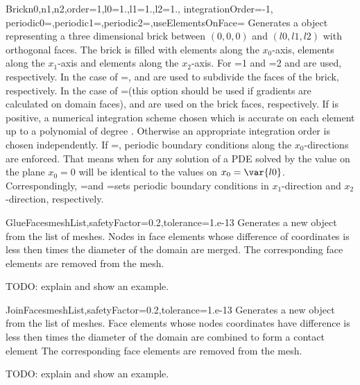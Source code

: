 \begin{funcdesc}{Brick}{n0,n1,n2,order=1,l0=1.,l1=1.,l2=1., integrationOrder=-1, \\
  periodic0=\False,periodic1=\False,periodic2=\False,useElementsOnFace=\False}
Generates a \Domain object representing a three dimensional brick between
$(0,0,0)$ and $(l0,l1,l2)$ with orthogonal faces. The brick is filled with
 elements along the $x_0$-axis, 
 elements along the $x_1$-axis and 
 elements along the $x_2$-axis. 
For =1 and =2
 and  
 are used, respectively. 
In the case of =\False,
 and  
 are used to subdivide the faces of the brick, respectively. 
In the case of =\True (this option should be used if gradients
are calculated on domain faces),
 and  
 are used on the brick faces, respectively.  
If  is positive, a numerical integration scheme
chosen which is accurate on each element up to a polynomial of
degree  . Otherwise
an appropriate integration order is chosen independently. If
=\True, periodic boundary conditions 
along the $x_0$-directions are enforced. That means when for any solution of a PDE solved by \finley
the value on the plane $x_0=0$ will be identical to the values on $x_0=\var{l0}$. Correspondingly,
=\False and =\False sets periodic boundary conditions
in $x_1$-direction and $x_2$-direction, respectively.
\end{funcdesc}

\begin{funcdesc}{GlueFaces}{meshList,safetyFactor=0.2,tolerance=1.e-13}
Generates a new \Domain object from the list  of \finley meshes.
Nodes in face elements whose difference of coordinates is less then  times the 
diameter of the domain are merged. The corresponding face elements are removed from the mesh.  

TODO: explain  and show an example.
\end{funcdesc}

\begin{funcdesc}{JoinFaces}{meshList,safetyFactor=0.2,tolerance=1.e-13}
Generates a new \Domain object from the list  of \finley meshes.
Face elements whose nodes coordinates have difference is less then  times the 
diameter of the domain are combined to form a contact element  
The corresponding face elements are removed from the mesh.  

TODO: explain  and show an example.
\end{funcdesc}
